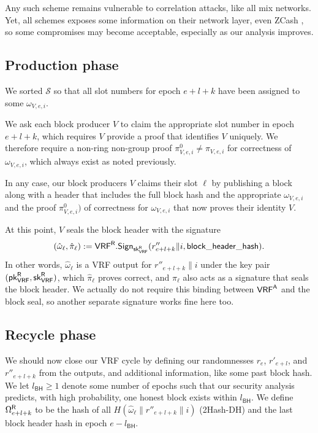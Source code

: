 Any such scheme remains vulnerable to correlation attacks, like all mix networks.  Yet, all schemes exposes some information on their network layer, even ZCash \cite{ZCash_vulnerable_2019}, so some compromises may become acceptable, especially as our analysis improves.  

\subsection{Production phase}\label{subsec:production_phase}

We sorted $\mathcal{S}$ so that all slot numbers for epoch $e+l+k$ have been assigned to some $\omega_{V,e,i}$.  

We ask each block producer $V$ to claim the appropriate slot number in epoch $e+l+k$, which requires $V$ provide a proof that identifies $V$ uniquely.  
We therefore require a non-ring non-group proof $\pi^0_{V,e,i} \ne \pi_{V,e,i}$ for correctness of $\omega_{V,e,i}$, which always exist as noted previously.

In any case, our block producers $V$ claims their slot $\ell$ by publishing a block along with a header that includes the full block hash and the appropriate $\omega_{V,e,i}$ and the proof $\pi^0_{V,e,i})$ of correctness for $\omega_{V,e,i}$ that now proves their identity $V$.  

At this point, $V$ seals the block header with the signature
$$ (\hat{\omega}_{\ell},\hat{\pi}_{\ell}) := \mathsf{VRF}^{\mathsf{R}}.\mathsf{Sign}_{\mathsf{sk}_{\mathsf{VRF}}^{\mathsf{R}}}(r''_{e+l+k} \| i, \mathsf{block\_header\_hash}) . $$
In other words, $\hat{\omega}_{\ell}$ is a VRF output for $r''_{e+l+k} \| i$ under the key pair $(\mathsf{pk}_{\mathsf{VRF}}^{\mathsf{R}},\mathsf{sk}_{\mathsf{VRF}}^{\mathsf{R}})$, which $\hat{\pi}_{\ell}$ proves correct, and $\hat{\pi}_{\ell}$ also acts as a signature that seals the block header.  We actually do not require this binding between $\mathsf{VRF}^{\mathsf{A}}$ and the block seal, so another separate signature works fine here too.


\subsection{Recycle phase}\label{subsec:recycle_phase}
\newcommand\id{\mathsf{id}}
\newcommand{\epochsdelayforblockhash}{l_{\mathsf{BH}}}
\newcommand{\epochsdelayforVDF}{l_{\mathsf{VDF}}}

We should now close our VRF cycle by defining our randomnesses $r_e$, $r'_{e+l}$, and $r''_{e+l+k}$ from the \VRFr outputs, and additional information, like some past block hash.  We let $\epochsdelayforblockhash \ge 1$ denote some number of epochs such that our security analysis predicts, with high probability, one honest block exists within $\epochsdelayforblockhash$.  We define $\Omega^{\mathsf{R}}_{e+l+k}$ to be the hash of all $H(\hat{\omega}_{\ell} \| r''_{e+l+k} \| i)$ (2Hash-DH) and the last block header hash in epoch $e - \epochsdelayforblockhash$.

